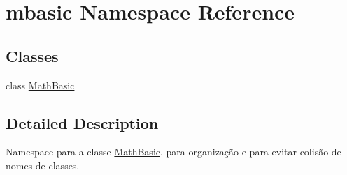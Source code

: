 \hypertarget{namespacembasic}{}\section{mbasic Namespace Reference}
\label{namespacembasic}
\subsection*{Classes}
\begin{DoxyCompactItemize}
\item 
class \hyperlink{classmbasic_1_1MathBasic}{Math\+Basic}
\end{DoxyCompactItemize}


\subsection{Detailed Description}
Namespace para a classe \hyperlink{classmbasic_1_1MathBasic}{Math\+Basic}. para organização e para evitar colisão de nomes de classes. 